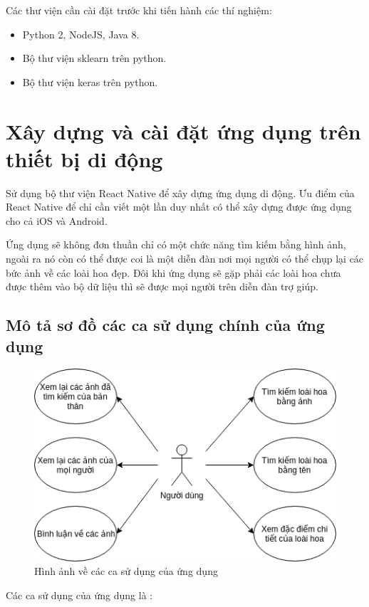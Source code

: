 \documentclass[12pt]{report}
\begin{document}
				
		Các thư viện cần cài đặt trước khi tiến hành các thí nghiệm:
				
		\begin{itemize}
			\item Python 2, NodeJS, Java 8.
			\item Bộ thư viện sklearn trên python.
			\item Bộ thư viện keras trên python.
		\end{itemize}
						
		\section{Xây dựng và cài đặt ứng dụng trên thiết bị di động}
		Sử dụng bộ thư viện React Native để xây dựng ứng dụng di động. Ưu điểm của React Native để chỉ cần viết một lần duy nhất có thể xây dựng được ứng dụng cho cả iOS và Android.
		
		Ứng dụng sẽ không đơn thuần chỉ có một chức năng tìm kiếm bằng hình ảnh, ngoài ra nó còn có thể được coi là một diễn đàn
		nơi mọi người có thể chụp lại các bức ảnh về các loài hoa đẹp. Đôi khi ứng dụng sẽ gặp phải các loài hoa chưa được thêm vào bộ dữ liệu thì sẽ được mọi người trên diễn đàn trợ giúp.

		\subsection{Mô tả sơ đồ các ca sử dụng chính của ứng dụng}
						
		\begin{figure}[h]
			\centering
			\includegraphics[scale=0.8]{usecase}
			\caption{Hình ảnh về các ca sử dụng của ứng dụng}
			\label{fig:usecase}
		\end{figure}
		Các ca sử dụng của ứng dụng là :
				
\end{document}
